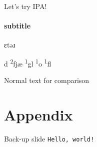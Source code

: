 
\begin{frame}{Let's try IPA!}
\framesubtitle{subtitle}

ɛtəɹ 

d \textsuperscript{2}fj\ae{}\textlengthmark{}\textrtaild{}\textschwa{} \textsuperscript{1}gl\textepsilon{}\textsubarch{\textsci{}} \textsuperscript{1}o\textlengthmark{} \textsuperscript{1}f\textscripta{}l

Normal text for comparison
\end{frame}

\startbackmatter
\section*{Appendix}

\begin{frame}{Back-up slide}
\texttt{Hello, world!}
\end{frame}


